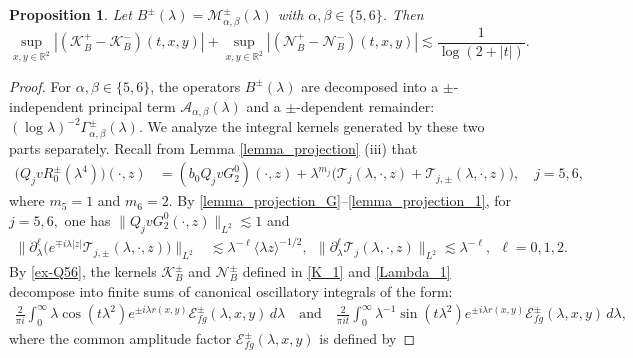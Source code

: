 \documentclass[reqno]{amsart}
\newtheorem{proposition}[theorem]{Proposition}
\numberwithin{equation}{section}
\begin{document}
   
\begin{proposition}\label{third_merged_1} 
	Let $B^\pm(\lambda)=\mathcal{M}_{\alpha, \beta}^{\pm}(\lambda)$ with $\alpha,\beta \in \{5,6\}$. Then      
	\[      
	\sup _{x, y \in \mathbb{R}^2}\left|\left(\mathcal{K}_{B}^+-\mathcal{K}_{B}^-\right)(t,x,y)\right| +      
	\sup _{x, y \in \mathbb{R}^2}\left|\left(\mathcal{N}_{B}^+-\mathcal{N}_{B}^-\right)(t,x,y)\right|  \lesssim \frac{1}{\log(2+|t|)}.      
	\]      
\end{proposition}      
\begin{proof}   
	For $\alpha, \beta \in \{5,6\}$, the operators $B^\pm(\lambda)$ are decomposed into a $\pm$-independent principal term $\mathcal{A}_{\alpha,\beta}(\lambda)$ and a $\pm$-dependent remainder: $(\log \lambda)^{-2}\Gamma_{\alpha,\beta}^{ \pm}(\lambda)$. We analyze the integral kernels generated by these two parts separately.  
	Recall from Lemma \ref{lemma_projection} (iii) that  
	\begin{align}\label{ex-Q56}  
		\bigl(Q_j v R_0^\pm(\lambda^4)\bigr)(\cdot,z) &= (b_0 Q_j v G_2^0)( \cdot,z) +\lambda^{m_j}\bigl(\mathcal{T}_{j}(\lambda, \cdot,z)+\mathcal{T}_{j,\pm}(\lambda, \cdot,z)\bigr), \quad j=5,6,
	\end{align}  
	where $m_5=1$ and $m_6=2$. 	By \eqref{lemma_projection_G}--\eqref{lemma_projection_1},  for $j=5,6,$  one has $\|Q_jvG_2^0(\cdot, z)\|_{L^2}\lesssim 1$ and
	\begin{equation*}
	\begin{split}       
	\big\| \partial_\lambda^\ell \bigl( e^{\mp i\lambda|z|}\mathcal{T}_{j,\pm}(\lambda, \cdot, z) \bigr) \big\|_{L^2}& \lesssim \lambda^{-\ell} \langle \lambda z \rangle^{-1/2}, \ \ 
	\big\| \partial_\lambda^\ell \mathcal{T}_j(\lambda, \cdot, z) \big\|_{L^2} \lesssim \lambda^{-\ell}, \ \   \ell=0,1,2.
	\end{split}    
	\end{equation*}        
	By \eqref{ex-Q56}, the kernels $\mathcal{K}_B^\pm$ and $\mathcal{N}_B^\pm$ defined in \eqref{K_1} and \eqref{Lambda_1} decompose into finite sums of canonical oscillatory integrals of the form:
	\begin{align}\label{3-4res-integral}
	\frac{2}{\pi i}\int_0^\infty \lambda \cos(t\lambda^2) e^{\pm i\lambda r(x,y)} \mathcal{E}_{fg}^\pm(\lambda, x, y) \, d\lambda \quad \text{and} \quad  
	\frac{2}{\pi i t} \int_0^\infty \lambda^{-1} \sin(t\lambda^2) e^{\pm i\lambda r(x,y)} \mathcal{E}_{fg}^\pm(\lambda, x, y) \, d\lambda,  
	\end{align}
	where the common amplitude factor $	\mathcal{E}_{fg}^\pm(\lambda, x, y) $ is defined by  

\end{proof}
\end{document}
